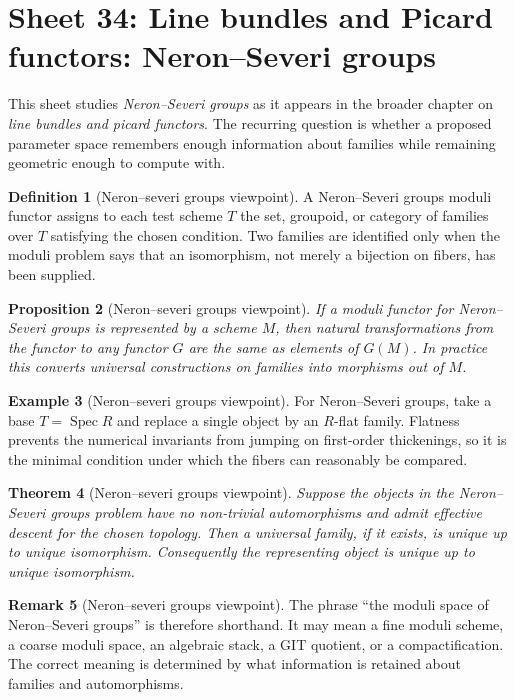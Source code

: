 \documentclass[11pt]{amsart}
\newtheorem{theorem}{Theorem}[section]
\newtheorem{proposition}[theorem]{Proposition}
\theoremstyle{definition}
\newtheorem{definition}[theorem]{Definition}
\newtheorem{example}[theorem]{Example}
\newtheorem{remark}[theorem]{Remark}
\newcommand{\Spec}{\operatorname{Spec}}
\begin{document}
\section{Sheet 34: Line bundles and Picard functors: Neron--Severi groups}
This sheet studies \emph{Neron--Severi groups} as it appears in the broader chapter on \emph{line bundles and picard functors}.  The recurring question is whether a proposed parameter space remembers enough information about families while remaining geometric enough to compute with.
\begin{definition}[Neron--severi groups viewpoint]
A Neron--Severi groups moduli functor assigns to each test scheme $T$ the set, groupoid, or category of families over $T$ satisfying the chosen condition.  Two families are identified only when the moduli problem says that an isomorphism, not merely a bijection on fibers, has been supplied.
\end{definition}
\begin{proposition}[Neron--severi groups viewpoint]
If a moduli functor for Neron--Severi groups is represented by a scheme $M$, then natural transformations from the functor to any functor $G$ are the same as elements of $G(M)$.  In practice this converts universal constructions on families into morphisms out of $M$.
\end{proposition}
\begin{example}[Neron--severi groups viewpoint]
For Neron--Severi groups, take a base $T=\Spec R$ and replace a single object by an $R$-flat family.  Flatness prevents the numerical invariants from jumping on first-order thickenings, so it is the minimal condition under which the fibers can reasonably be compared.
\end{example}
\begin{theorem}[Neron--severi groups viewpoint]
Suppose the objects in the Neron--Severi groups problem have no non-trivial automorphisms and admit effective descent for the chosen topology.  Then a universal family, if it exists, is unique up to unique isomorphism.  Consequently the representing object is unique up to unique isomorphism.
\end{theorem}
\begin{remark}[Neron--severi groups viewpoint]
The phrase ``the moduli space of Neron--Severi groups'' is therefore shorthand.  It may mean a fine moduli scheme, a coarse moduli space, an algebraic stack, a GIT quotient, or a compactification.  The correct meaning is determined by what information is retained about families and automorphisms.
\end{remark}
\end{document}
